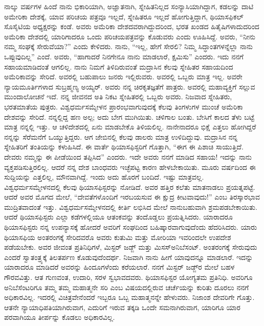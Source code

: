 ನಾಲ್ಕು ವರ್ಷಗಳ ಹಿಂದೆ ನಾನು ಭಿಕಾರಿಯಾಗಿ, ಅಜ್ಞಾತನಾಗಿ, ಸ್ನೇಹಿತನಿಲ್ಲದ ಸಂನ್ಯಾಸಿಯಾಗಿದ್ದಾಗ, ಕಡಲನ್ನು ದಾಟಿ ಅಮೇರಿಕಾ ದೇಶಕ್ಕೆ, ಯಾವ ಪರಿಚಯ ಪತ್ರವೂ ಇಲ್ಲದೆ, ಸ್ನೇಹಿತರೂ ಇಲ್ಲದೆ ಹೋಗುತ್ತಿದ್ದಾಗ, ಥಿಯಾಸಫಿಕಲ್​ ಸೊಸೈಟಿಯ ಅಧ್ಯಕ್ಷರನ್ನು ಕಂಡೆ. ಅವರು ಅಮೆರಿಕಾ ದೇಶದವರಾಗಿದ್ದುದರಿಂದ, ಭರತ ಖಂಡದ ಹಿತೈಷಿಗಳಾದುದರಿಂದ ಅಮೆರಿಕಾ ದೇಶದಲ್ಲಿ ಯಾರಿಗಾದರೂ ಒಂದು ಪರಿಚಯಪತ್ರವನ್ನು ಕೊಡುವರು ಎಂದು ಊಹಿಸಿದ್ದೆ. ಅವರು, “ನೀನು ನಮ್ಮ ಸಂಘಕ್ಕೆ ಸೇರುವೆಯಾ?” ಎಂದು ಕೇಳಿದರು. ನಾನು, “ಇಲ್ಲ, ಹೇಗೆ ಸೇರಲಿ? ನಿಮ್ಮ ಸಿದ್ಧಾಂತಗಳನ್ನೆಲ್ಲಾ ನಾನು ಒಪ್ಪುವುದಿಲ್ಲ” ಎಂದೆ. ಅವರು, “ಹಾಗಾದರೆ ನಿನಗೇನೂ ನಾನು ಮಾಡಲಾರೆ, ಕ್ಷಮಿಸು” ಎಂದರು. ಇದು ನನಗೆ ಸಹಾಯಮಾಡಿದಂತೆ ಆಗಲಿಲ್ಲ. ನಾನು ನಿಮಗೆ ತಿಳಿದಿರುವಂತೆ ಮದ್ರಾಸಿನ ಕೆಲವು ಸ್ನೇಹಿತರ ಸಹಾಯದಿಂದ ಅಮೆರಿಕಾವನ್ನು ಸೇರಿದೆ. ಅವರಲ್ಲಿ ಬಹುಪಾಲು ಜನರು ಇಲ್ಲಿರುವರು. ಅವರಲ್ಲಿ ಒಬ್ಬರು ಮಾತ್ರ ಇಲ್ಲ. ಅವರೇ ನ್ಯಾಯಮೂರ್ತಿಗಳಾದ ಸುಬ್ರಹ್ಮಣ್ಯ ಅಯ್ಯರ್​. ಅವರು ನನ್ನ ಚಿರಕೃತಜ್ಞತೆಗೆ ಪಾತ್ರರು. ಅವರಲ್ಲಿ ಮಹಾವ್ಯಕ್ತಿಗೆ ಸಲ್ಲುವ ಮುಂದಾಲೋಚನೆ ಇದೆ. ನನ್ನ ಜೀವನದ ಅತಿ ನಿಕಟ ಸ್ನೇಹಿತರಲ್ಲಿ ಒಬ್ಬರು ಅವರು. ನಿಜವಾದ ಸ್ನೇಹಿತರು, ಭರತಮಾತೆಯ ಪುತ್ರರು. ವಿಶ್ವಧರ್ಮಸಮ್ಮೇಳನ ಪ್ರಾರಂಭವಾಗುವುದಕ್ಕೆ ಕೆಲವು ತಿಂಗಳುಗಳ ಮುಂಚೆ ಅಮೆರಿಕಾ ದೇಶವನ್ನು ಸೇರಿದೆ. ನನ್ನಲ್ಲಿದ್ದ ಹಣ ಅಲ್ಪ; ಅದು ಬೇಗ ಮುಗಿಯಿತು. ಚಳಿಗಾಲ ಬಂತು. ಬೇಸಿಗೆ ಕಾಲದ ತೆಳು ಬಟ್ಟೆ ಮಾತ್ರ ನನ್ನಲ್ಲಿ ಇತ್ತು. ಆ ಚಳಿದೇಶದಲ್ಲಿ ಏನು ಮಾಡಬೇಕೊ ತಿಳಿಯಲಿಲ್ಲ. ನಾನೇನಾದರೂ ಭಿಕ್ಷೆ ಎತ್ತಲು ಹೋಗಿದ್ದರೆ ನನ್ನನ್ನು ಸೆರೆಮನೆಗೆ ಒಯ್ಯುತ್ತಿದ್ದರು. ಆಗ ಜೇಬಿನಲ್ಲಿ ಕೆಲವು ಡಾಲರು ಮಾತ್ರ ಉಳಿದಿದ್ದುವು. ಮದ್ರಾಸಿನ ನನ್ನ ಸ್ನೇಹಿತರಿಗೆ ತಂತಿಯನ್ನು ಕಳುಹಿಸಿದೆ. ಈ ವಾರ್ತೆ ಥಿಯಾಸಫಿಸ್ಟರಿಗೆ ಗೊತ್ತಾಗಿ, “ಈಗ ಈ ಪಿಶಾಚಿ ಸಾಯುತ್ತಿದೆ. ದೇವರು ನಮ್ಮನ್ನು ಈ ಪೀಡೆಯಿಂದ ತಪ್ಪಿಸಿದ” ಎಂದರು. ಇದೇ ಅವರು ನನಗೆ ಮಾಡಿದ ಸಹಾಯ! ಇದನ್ನು ನಾನು ವ್ಯಕ್ತಪಡಿಸುತ್ತಿರಲಿಲ್ಲ. ಆದರೆ ನನ್ನ ದೇಶ ಬಾಂಧವರು ಇಚ್ಛೆಪಟ್ಟ ಕಾರಣ ಹೇಳಬೇಕಾಯಿತು. ಮೂರು ವರ್ಷದಿಂದ ಈ ಸುದ್ದಿಯನ್ನು ಎತ್ತಲಿಲ್ಲ, ಮೌನವಾಗಿದ್ದೆ. ಇಂದು ಅದು ಹೊರಗೆ ಬಂದಿದೆ. ಇಷ್ಟು ಮಾತ್ರವಲ್ಲ. ವಿಶ್ವಧರ್ಮಸಮ್ಮೇಳನದಲ್ಲಿ ಕೆಲವು ಥಿಯಾಸಫಿಸ್ಟರನ್ನು ನೋಡಿದೆ. ಅವರ ಹತ್ತಿರ ಕಲೆತು ಮಾತನಾಡಲು ಪ್ರಯತ್ನಪಟ್ಟೆ. ಆದರೆ ಅವರ ಮೊಗದ ಮೇಲೆ, “ದೇವತೆಗಳೊಂದಿಗೆ ಇರಬಯಸುವ ಈ ಕ್ಷುದ್ರ ಕೀಟವಾವುದು!” ಎಂಬ ತಿರಸ್ಕಾರಭಾವ ಮುದ್ರಿತವಾದಂತೆ ಇತ್ತು. ವಿಶ್ವಧರ್ಮಸಮ್ಮೇಳನದಲ್ಲಿ ಕೀರ್ತಿ ಲಭಿಸಿದ ಮೇಲೆ ನಾನು\break ಬಹುವಾಗಿ ಶ್ರಮಪಡಬೇಕಾಯಿತು. ಆದರೆ ಥಿಯಾಸಫಿಸ್ಟರು ಎಲ್ಲಾ ಕಡೆಗಳಲ್ಲಿಯೂ ಆತಂಕವನ್ನು ತಂದೊಡ್ಡಲು ಪ್ರಯತ್ನಿಸಿದರು. ಯಾರಾದರೂ ಥಿಯಾಸಫಿಸ್ಟರು ನನ್ನ ಉಪನ್ಯಾಸಕ್ಕೆ ಹೋದರೆ ಅವರಿಗೆ ಸಂಘದಿಂದ ಬಹಿಷ್ಕಾರವಾಗುವುದೆಂದು ಹೆದರಿಸಿದರು. ಯಾರು ಥಿಯಾಸಫಿಯ ಅಂತರಂಗಕ್ಕೆ ಸೇರಿದವರೊ ಅವರು ಕುತುಮಿ ಮತ್ತು ಮೋರಿಯಾ ಇವರಿಂದಲೇ ಉಪದೇಶ ಪಡೆಯಬೇಕು. ಅವರ ಜೀವಂತ ಪ್ರತಿನಿಧಿಗಳೆ, ಮಿಸ್ಟರ್​ ಜಡ್ಜ್ ಮತ್ತು ಮಿಸಸ್​ ಅನಿಬೆಸಂಟ್​. ಅಂತರಂಗಕ್ಕೆ ಸೇರುವುದು ಎಂದರೆ ಸ್ವಾತಂತ್ರ್ಯಕ್ಕೆ ತಿಲತರ್ಪಣ ಕೊಡುವುದೆಂದರ್ಥ. ನಿಜವಾಗಿ ನಾನು ಹೀಗೆ ಯಾವುದನ್ನೂ ಮಾಡಲಾರೆ. ಇದನ್ನು ಯಾರಾದರೂ ಮಾಡಿದರೆ ಅವರನ್ನು ಹಿಂದೂಗಳೆಂದು ಕರೆಯಲಾರೆ. ನನಗೆ ಮಿಸ್ಟರ್​ ಜಡ್ಜ್‌ರ ಮೇಲೆ ಬಹಳ ಗೌರವವಿತ್ತು. ಆತ ಗುಣವಂತ, ಉದಾರಿ, ಸರಳ ಸ್ವಭಾವದವರು. ಥಿಯಾಸಫಿಸ್ಟರ ಯೋಗ್ಯತಮ ಪ್ರತಿನಿಧಿ. ಅವರಿಗೂ ಅನಿಬೆಸೆಂಟರಿಗೂ ತಮ್ಮ ತಮ್ಮ ಮಹಾತ್ಮನೇ ಸರಿ ಎಂಬ ವಿಷಯದಲ್ಲಿರುವ ಚರ್ಚೆಯನ್ನು ಕುರಿತು ದೂರಲು ನನಗೆ ಅಧಿಕಾರವಿಲ್ಲ. ಇದರಲ್ಲಿ ವಿಚಿತ್ರವೇನೆಂದರೆ ಇಬ್ಬರೂ ಒಬ್ಬ ಮಹಾತ್ಮನನ್ನೇ ಹೇಳುವರು. ನಿಜಾಂಶ ದೇವರಿಗೇ ಗೊತ್ತು. ಆತನೇ ನ್ಯಾಯಾಧಿಪತಿಯಾಗಿರುವಾಗ, ಎದುರಿಗೆ ಇರುವ ತಕ್ಕಡಿ ಒಂದೇ ಸಮನಾಗಿರುವಾಗ, ಯಾರಿಗೂ ಯಾರ ಪರವಾಗಿಯೂ ತೀರ್ಪನ್ನು ಕೊಡಲು ಅಧಿಕಾರವಿಲ್ಲ.

